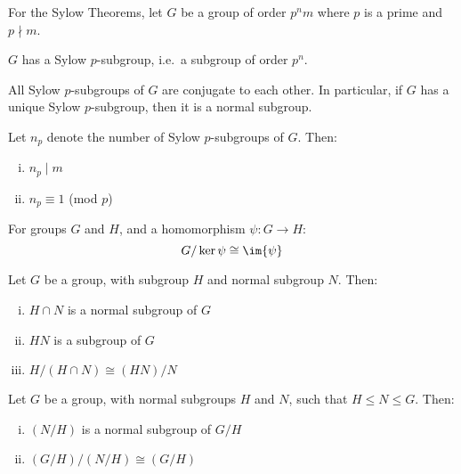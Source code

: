 For the Sylow Theorems, let \(G\) be a group of order \(p^n m\) where \(p\) is a prime and \(p\nmid m\).
\begin{theorem}\label{thm:sylow1}
    \(G\) has a Sylow \(p\)-subgroup, i.e.\ a subgroup of order \(p^n\).
\end{theorem}
\begin{theorem}\label{thm:sylow2}
    All Sylow \(p\)-subgroups of \(G\) are conjugate to each other.
    In particular, if \(G\) has a unique Sylow \(p\)-subgroup, then it is a normal subgroup.
\end{theorem}
\begin{theorem}\label{thm:sylow3}
    Let \(n_p\) denote the number of Sylow \(p\)-subgroups of \(G\).
    Then:
    \begin{enumerate}[(i)]
        \item \(n_p \mid m\)
        \item \(n_p\equiv 1\) (mod \(p\))
    \end{enumerate}
\end{theorem}

\begin{theorem}\label{thm:iso1}
    For groups \(G\) and \(H\), and a homomorphism \(\psi:G \to H\):
    \[G / \ker{\psi} \cong \im{\psi}\]
\end{theorem}

\begin{theorem}\label{thm:iso2}
    Let \(G\) be a group, with subgroup \(H\) and normal subgroup \(N\).
    Then:
    \begin{enumerate}[(i)]
        \item \(H \cap N\) is a normal subgroup of \(G\)
        \item \(HN\) is a subgroup of \(G\) 
        \item \(H / (H \cap N) \cong (HN) / N\)
    \end{enumerate}
\end{theorem}

\begin{theorem}\label{thm:iso3}
    Let \(G\) be a group, with normal subgroups \(H\) and \(N\), such that \(H \leqslant N \leqslant G\).
    Then:
    \begin{enumerate}[(i)]
        \item \((N / H)\) is a normal subgroup of \(G / H\)
        \item \((G / H) / (N / H) \cong (G / H)\)
    \end{enumerate}
\end{theorem}


